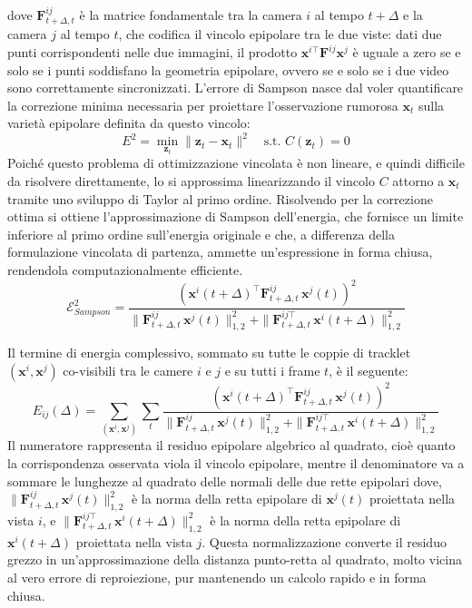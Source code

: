 dove $\mathbf{F}^{ij}_{t+\Delta,t}$ è la matrice fondamentale tra la camera $i$ al tempo $t+\Delta$ e la camera $j$ al tempo $t$, che codifica il vincolo epipolare tra le due viste: dati due punti corrispondenti nelle due immagini, il prodotto $\mathbf{x}^{i\top} \mathbf{F}^{ij} \mathbf{x}^j$ è uguale a zero se e solo se i punti soddisfano la geometria epipolare, ovvero se e solo se i due video sono correttamente sincronizzati. L'errore di Sampson nasce dal voler quantificare la correzione minima necessaria per proiettare l'osservazione rumorosa $\mathbf{x}_t$ sulla varietà epipolare definita da questo vincolo:
\begin{equation}
E^2 = \min_{\mathbf{z}_t} \|\mathbf{z}_t - \mathbf{x}_t\|^2 \quad \text{s.t. } C(\mathbf{z}_t) = 0
\end{equation}
Poiché questo problema di ottimizzazione vincolata è non lineare, e quindi difficile da risolvere direttamente, lo si approssima linearizzando il vincolo $C$ attorno a $\mathbf{x}_t$ tramite uno sviluppo di Taylor al primo ordine. Risolvendo per la correzione ottima si ottiene l'approssimazione di Sampson dell'energia, che fornisce un limite inferiore al primo ordine sull'energia originale e che, a differenza della formulazione vincolata di partenza, ammette un'espressione in forma chiusa, rendendola computazionalmente efficiente. 
\begin{equation}
\mathcal{E}^2_{Sampson} = \frac{\left(\mathbf{x}^i(t+\Delta)^\top \mathbf{F}^{ij}_{t+\Delta,t}\, \mathbf{x}^j(t)\right)^2}{\|\mathbf{F}^{ij}_{t+\Delta,t}\, \mathbf{x}^j(t)\|^2_{1,2} + \|\mathbf{F}^{ij\top}_{t+\Delta,t}\, \mathbf{x}^i(t+\Delta)\|^2_{1,2}}
\end{equation}

Il termine di energia complessivo, sommato su tutte le coppie di tracklet $(\mathbf{x}^i, \mathbf{x}^j)$ co-visibili tra le camere $i$ e $j$ e su tutti i frame $t$, è il seguente:
\begin{equation}
E_{ij}(\Delta) = \sum_{(\mathbf{x}^i, \mathbf{x}^j)} \sum_t \frac{\left(\mathbf{x}^i(t+\Delta)^\top \mathbf{F}^{ij}_{t+\Delta,t}\, \mathbf{x}^j(t)\right)^2}{\|\mathbf{F}^{ij}_{t+\Delta,t}\, \mathbf{x}^j(t)\|^2_{1,2} + \|\mathbf{F}^{ij\top}_{t+\Delta,t}\, \mathbf{x}^i(t+\Delta)\|^2_{1,2}}
\end{equation}
Il numeratore rappresenta il residuo epipolare algebrico al quadrato, cioè quanto la corrispondenza osservata viola il vincolo epipolare, mentre il denominatore va a sommare le lunghezze al quadrato delle normali delle due rette epipolari dove, $\|\mathbf{F}^{ij}_{t+\Delta,t}\, \mathbf{x}^j(t)\|^2_{1,2}$ è la norma della retta epipolare di $\mathbf{x}^j(t)$ proiettata nella vista $i$, e $\|\mathbf{F}^{ij\top}_{t+\Delta,t}\, \mathbf{x}^i(t+\Delta)\|^2_{1,2}$ è la norma della retta epipolare di $\mathbf{x}^i(t+\Delta)$ proiettata nella vista $j$. Questa normalizzazione converte il residuo grezzo in un'approssimazione della distanza punto-retta al quadrato, molto vicina al vero errore di reproiezione, pur mantenendo un calcolo rapido e in forma chiusa.

